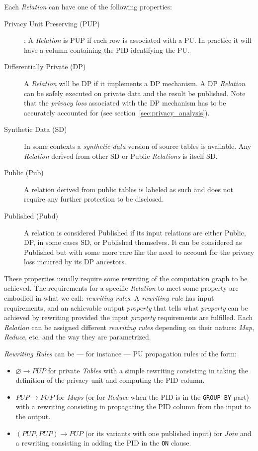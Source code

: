 \documentclass{article}
\begin{document}
    Each \emph{Relation} can have one of the following properties:
    \begin{description}
        \item[Privacy Unit Preserving (PUP)]: A \emph{Relation} is PUP if each row is associated with a PU. In practice it will have a column containing the PID identifying the PU.
        \item[Differentially Private (DP)] A \emph{Relation} will be DP if it implements a DP mechanism. A DP \emph{Relation} can be safely  executed on private data and the result be published. Note that the \emph{privacy loss} associated with the DP mechanism has to be accurately accounted for (see section~\ref{sec:privacy_analysis}).
        \item[Synthetic Data (SD)] In some contexts a \emph{synthetic data} version of source tables is available. Any \emph{Relation} derived from other SD or Public \emph{Relations} is itself SD.
        \item[Public (Pub)] A relation derived from public tables is labeled as such and does not require any further protection to be disclosed.
        \item[Published (Pubd)] A relation is considered Published if its input relations are either Public, DP, in some cases SD, or Published themselves. It can be considered as Published but with some more care like the need to account for the privacy loss incurred by its DP ancestors.
    \end{description}
    
    These properties usually require some rewriting of the computation graph to be achieved. The requirements for a specific \emph{Relation} to meet some property are embodied in what we call: \emph{rewriting rules}.
    A \emph{rewriting rule} has input requirements, and an achievable output \emph{property} that tells what \emph{property} can be achieved by rewriting provided the input \emph{property} requirements are fulfilled.
    Each \emph{Relation} can be assigned different \emph{rewriting rules} depending on their nature: \emph{Map}, \emph{Reduce}, etc. and the way they are parametrized.
    
    \emph{Rewriting Rules} can be --- for instance --- PU propagation rules of the form:
    \begin{itemize}
        \item $\varnothing \rightarrow PUP$ for private \emph{Tables} with a simple rewriting consisting in taking the definition of the privacy unit and computing the PID column.
        \item $PUP \rightarrow PUP$ for \emph{Maps} (or for \emph{Reduce} when the PID is in the \texttt{GROUP BY} part) with a rewriting consisting in propagating the PID column from the input to the output.
        \item $(PUP, PUP) \rightarrow PUP$ (or its variants with one published input) for \emph{Join} and a rewriting consisting in adding the PID in the \texttt{ON} clause.
    \end{itemize}
    
\end{document}
